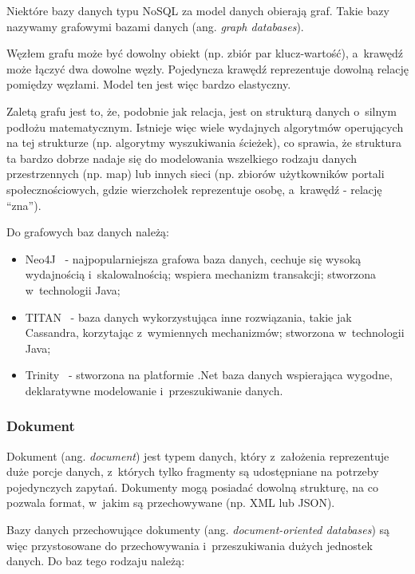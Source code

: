 Niektóre bazy danych typu NoSQL za model danych obierają graf.
Takie bazy nazywamy grafowymi bazami danych (ang. \emph{graph databases}).

Węzłem grafu może być dowolny obiekt (np. zbiór par klucz-wartość), a~krawędź może łączyć dwa dowolne węzły.
Pojedyncza krawędź reprezentuje dowolną relację pomiędzy węzłami.
Model ten jest więc bardzo elastyczny.

Zaletą grafu jest to, że, podobnie jak relacja, jest on strukturą danych o~silnym podłożu matematycznym.
Istnieje więc wiele wydajnych algorytmów operujących na tej strukturze (np. algorytmy wyszukiwania ścieżek), co sprawia, że struktura ta bardzo dobrze nadaje się do modelowania wszelkiego rodzaju danych przestrzennych (np. map) lub innych sieci (np. zbiorów użytkowników portali społecznościowych, gdzie wierzchołek reprezentuje osobę, a~krawędź - relację ``zna'').

Do grafowych baz danych należą:

\begin{itemize}
 \item Neo4J~\cite{neo4j} - najpopularniejsza grafowa baza danych, cechuje się wysoką wydajnością i~skalowalnością; wspiera mechanizm transakcji; stworzona w~technologii Java;
 \item TITAN~\cite{titan} - baza danych wykorzystująca inne rozwiązania, takie jak Cassandra, korzytając z~wymiennych mechanizmów; stworzona w~technologii Java;
 \item Trinity~\cite{trinity} - stworzona na platformie .Net baza danych wspierająca wygodne, deklaratywne modelowanie i~przeszukiwanie danych.
\end{itemize}

\subsubsection{Dokument}

Dokument (ang. \emph{document}) jest typem danych, który z~założenia reprezentuje duże porcje danych, z~których tylko fragmenty są udostępniane na potrzeby pojedynczych zapytań.
Dokumenty mogą posiadać dowolną strukturę, na co pozwala format, w~jakim są przechowywane (np. XML lub JSON).

Bazy danych przechowujące dokumenty (ang. \emph{document-oriented databases}) są więc przystosowane do przechowywania i~przeszukiwania dużych jednostek danych.
Do baz tego rodzaju należą:

